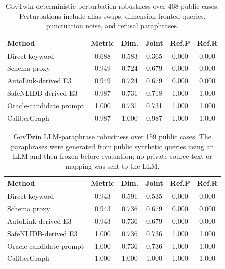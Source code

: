 \documentclass[letterpaper]{article}
\begin{document}
\begin{table}[h]
\centering
\scriptsize
\begin{tabular}{lccccc}
\toprule
Method & Metric & Dim. & Joint & Ref.P & Ref.R \\
\midrule
Direct keyword & 0.688 & 0.583 & 0.365 & 0.000 & 0.000 \\
Schema proxy & 0.949 & 0.724 & 0.679 & 0.000 & 0.000 \\
AutoLink-derived E3 & 0.949 & 0.724 & 0.679 & 0.000 & 0.000 \\
SafeNLIDB-derived E3 & 0.987 & 0.731 & 0.718 & 1.000 & 1.000 \\
Oracle-candidate prompt & 1.000 & 0.731 & 0.731 & 1.000 & 1.000 \\
CaliberGraph & 0.987 & 1.000 & 0.987 & 1.000 & 1.000 \\
\bottomrule
\end{tabular}
\caption{GovTwin deterministic perturbation robustness over 468 public cases. Perturbations include alias swaps, dimension-fronted queries, punctuation noise, and refusal paraphrases.}
\end{table}

\begin{table}[h]
\centering
\scriptsize
\begin{tabular}{lccccc}
\toprule
Method & Metric & Dim. & Joint & Ref.P & Ref.R \\
\midrule
Direct keyword & 0.943 & 0.591 & 0.535 & 0.000 & 0.000 \\
Schema proxy & 0.943 & 0.736 & 0.679 & 0.000 & 0.000 \\
AutoLink-derived E3 & 0.943 & 0.736 & 0.679 & 0.000 & 0.000 \\
SafeNLIDB-derived E3 & 1.000 & 0.736 & 0.736 & 1.000 & 1.000 \\
Oracle-candidate prompt & 1.000 & 0.736 & 0.736 & 1.000 & 1.000 \\
CaliberGraph & 1.000 & 1.000 & 1.000 & 1.000 & 1.000 \\
\bottomrule
\end{tabular}
\caption{GovTwin LLM-paraphrase robustness over 159 public cases. The paraphrases were generated from public synthetic queries using an LLM and then frozen before evaluation; no private source text or mapping was sent to the LLM.}
\end{table}
\end{document}
